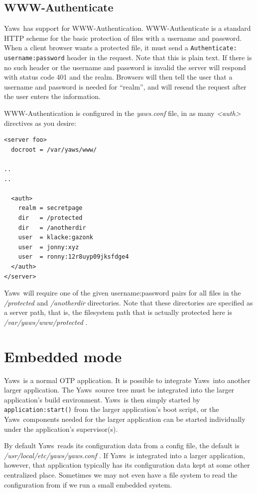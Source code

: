 \documentclass[11pt,oneside,english]{book}
\newcommand{\Yaws}            %
        {{\sc Yaws}}
\begin{document}
\section{WWW-Authenticate}
\Yaws\  has support for WWW-Authentication.   WWW-Authenticate is a
standard HTTP scheme for the basic protection of files with a username
and password.  When a client browser wants a protected file, it must send a
\verb+Authenticate: username:password+ header in the request.  Note that
this is plain text.   If there is no such header or the username and
password is invalid the server will respond with status code 401 and
the realm.  Browsers will then tell the user that a username and
password is needed for ``realm'',  and will resend the request after
the user enters the information.

WWW-Authentication is configured in the \textit{yaws.conf} file, in as
many \textit{<auth>} directives as you desire:

\begin{verbatim}
<server foo>
  docroot = /var/yaws/www/

..
..

  <auth>
    realm = secretpage
    dir   = /protected
    dir   = /anotherdir
    user  = klacke:gazonk
    user  = jonny:xyz
    user  = ronny:12r8uyp09jksfdge4
  </auth>
</server>
\end{verbatim}


\Yaws\  will require one of the given username:password pairs for all
files in the \textit{/protected} and \textit{/anotherdir} directories.
Note that these directories are specified as a server path,  that is,
the filesystem path that is actually protected here is
\textit{/var/yaws/www/protected} .


\chapter {Embedded mode}
\label{embedded}

\Yaws\  is a normal OTP application. It is possible to integrate \Yaws\
into another larger application. The \Yaws\  source tree must be
integrated into the larger application's build environment. \Yaws\  is
then simply started by \verb+application:start()+ from the larger
application's boot script, or the \Yaws\  components needed for the
larger application can be started individually under the application's
supervisor(s).

By default \Yaws\ reads its configuration data from a config file, the
default is \textit{/usr/local/etc/yaws/yaws.conf} . If \Yaws\ is integrated
into a larger application, however, that application typically has its
configuration data kept at some other centralized place. Sometimes we
may not even have a file system to read the configuration from if we
run a small embedded system.
\end{document}
